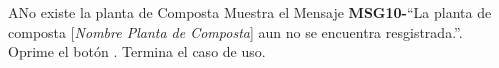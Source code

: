 \begin{UCtrayectoriaA}{A}{No existe la planta de Composta}
	\UCpaso Muestra el Mensaje {\bf MSG10-}``La planta de composta  [{\em Nombre Planta de Composta}] aun no se encuentra resgistrada.''.
	\UCpaso[\UCactor] Oprime el botón .
	\UCpaso[] Termina el caso de uso.
\end{UCtrayectoriaA}

		
